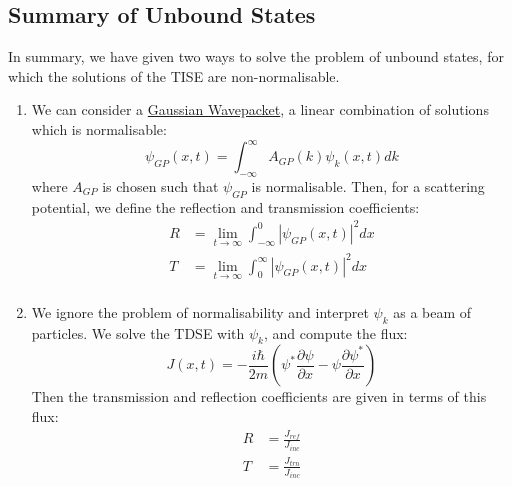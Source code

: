 \documentclass[../Main.tex]{subfiles}
\begin{document}
\subsection{Summary of Unbound States}
In summary, we have given two ways to solve the problem of unbound states, for which the solutions of the TISE are non-normalisable.
\begin{enumerate}
    \item We can consider a \underline{Gaussian Wavepacket}, a linear combination of solutions which is normalisable:
        \begin{equation*}
            \psi_{GP}(x, t) = \int_{-\infty}^{\infty} A_{GP}(k) \psi_k(x, t) dk 
        \end{equation*}
        where $A_{GP}$ is chosen such that $\psi_{GP}$ is normalisable.
        Then, for a scattering potential, we define the reflection and transmission coefficients:
        \begin{align*}
            R &= \lim_{t \to \infty} \int_{-\infty}^{0} |\psi_{GP}(x, t)|^2 dx \\
            T &= \lim_{t \to \infty} \int_{0}^{\infty} |\psi_{GP}(x, t)|^2 dx \\
        \end{align*}
    \item We ignore the problem of normalisability and interpret $\psi_k$ as a beam of particles. We solve the TDSE with $\psi_k$, and compute the flux:
        \begin{equation*}
            J(x, t) = -\frac{i\hbar}{2m} \left(\psi^* \frac{\partial \psi}{\partial x} - \psi \frac{\partial \psi^*}{\partial x}\right)
        \end{equation*}
        Then the transmission and reflection coefficients are given in terms of this flux:
        \begin{align*}
            R &= \frac{J_{ref}}{J_{inc}}\\
            T &= \frac{J_{trn}}{J_{inc}}
        \end{align*}
\end{enumerate}
\end{document}
